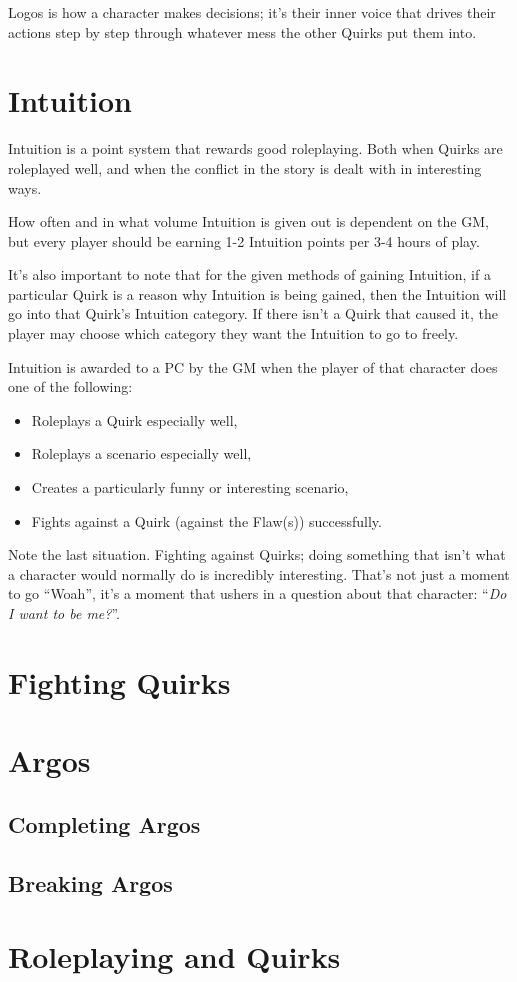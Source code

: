 \documentclass[../main.tex]{subfiles}
\begin{document}
    Logos is how a character makes decisions; it's their inner voice that drives their actions step by step through whatever mess the other Quirks put them into.

    \section{Intuition}

    Intuition is a point system that rewards good roleplaying. Both when Quirks are roleplayed well, and when the conflict in the story is dealt with in interesting ways.

    How often and in what volume Intuition is given out is dependent on the GM, but every player should be earning 1-2 Intuition points per 3-4 hours of play.

    It's also important to note that for the given methods of gaining Intuition, if a particular Quirk is a reason why Intuition is being gained, then the Intuition will go into that Quirk's Intuition category. If there isn't a Quirk that caused it, the player may choose which category they want the Intuition to go to freely.

    Intuition is awarded to a PC by the GM when the player of that character does one of the following:

    \begin{itemize}
        \item Roleplays a Quirk especially well,
        \item Roleplays a scenario especially well,
        \item Creates a particularly funny or interesting scenario,
        \item Fights against a Quirk (against the Flaw(s)) successfully.
    \end{itemize}

    Note the last situation. Fighting against Quirks; doing something that isn't what a character would normally do is incredibly interesting. That's not just a moment to go ``Woah'', it's a moment that ushers in a question about that character: ``\emph{Do I want to be me?}''.

    \section{Fighting Quirks}
    
    

    \section{Argos}

    \subsection{Completing Argos}

    \subsection{Breaking Argos}

    \section{Roleplaying and Quirks}
\end{document}
